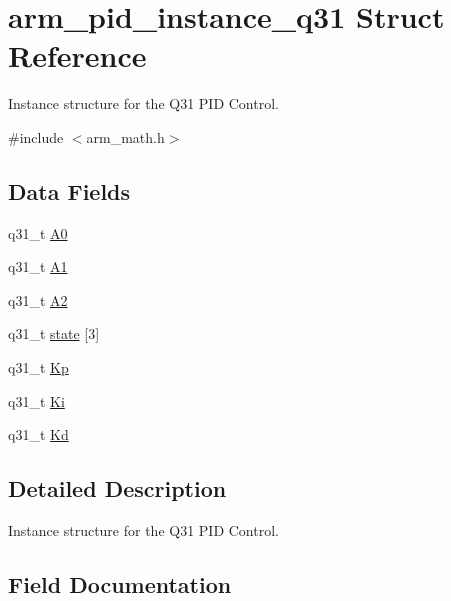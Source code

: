 \hypertarget{structarm__pid__instance__q31}{}\section{arm\+\_\+pid\+\_\+instance\+\_\+q31 Struct Reference}
\label{structarm__pid__instance__q31}


Instance structure for the Q31 P\+ID Control.  




{\ttfamily \#include $<$arm\+\_\+math.\+h$>$}

\subsection*{Data Fields}
\begin{DoxyCompactItemize}
\item 
q31\+\_\+t \mbox{\hyperlink{structarm__pid__instance__q31_ab58496a4137da4c667915a5fc0ef57ef}{A0}}
\item 
q31\+\_\+t \mbox{\hyperlink{structarm__pid__instance__q31_aeb897c84724b56948e4222aca8d0e1f4}{A1}}
\item 
q31\+\_\+t \mbox{\hyperlink{structarm__pid__instance__q31_a4ae945f839719fb2c04c978724b78ebb}{A2}}
\item 
q31\+\_\+t \mbox{\hyperlink{structarm__pid__instance__q31_af0a2da4da9a94af652873ec7e7be4880}{state}} \mbox{[}3\mbox{]}
\item 
q31\+\_\+t \mbox{\hyperlink{structarm__pid__instance__q31_a6ec4b37fe2246a7e017dd07578fe5bbd}{Kp}}
\item 
q31\+\_\+t \mbox{\hyperlink{structarm__pid__instance__q31_a84a6c05c16369c905193da0d5fc9a7b0}{Ki}}
\item 
q31\+\_\+t \mbox{\hyperlink{structarm__pid__instance__q31_a213bbf14da7ea536998f611977173552}{Kd}}
\end{DoxyCompactItemize}


\subsection{Detailed Description}
Instance structure for the Q31 P\+ID Control. 

\subsection{Field Documentation}
\mbox{\label{structarm__pid__instance__q31_ab58496a4137da4c667915a5fc0ef57ef}} 
